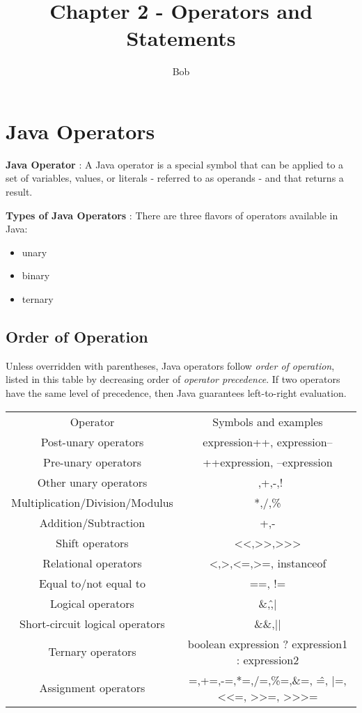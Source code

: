 \documentclass{article}
\author{Bob}
\title{Chapter 2 - Operators and Statements}
\begin{document}
\maketitle

\section{Java Operators}
\textbf{Java Operator} : A Java operator is a special symbol that can be applied to a set of variables, values, or literals - referred to as operands - and that returns a result.

\textbf{Types of Java Operators} : There are three flavors of operators available in Java: 
\begin{itemize}
	\item unary
	\item binary
	\item ternary
\end{itemize}

\subsection{Order of Operation}
Unless overridden with parentheses, Java operators follow \emph{order of operation}, listed in this table by decreasing order of \emph{operator precedence}. If two operators have the same level of precedence, then Java guarantees left-to-right evaluation.

\begin{tabular}{|c|c|}
	\cline{1-2}
	Operator & Symbols and examples \\
	\cline{1-2}
	Post-unary operators & expression++, expression-- \\
	Pre-unary operators & ++expression, --expression \\
	Other unary operators & ~,+,-,! \\
	Multiplication/Division/Modulus & *,/,\% \\
	Addition/Subtraction & +,- \\
	Shift operators & <<,>>,>>> \\
	Relational operators & <,>,<=,>=, instanceof \\
	Equal to/not equal to & ==, != \\
	Logical operators & \&,\^,| \\
	Short-circuit logical operators & \&\&,|| \\
	Ternary operators & boolean expression ? expression1 : expression2 \\
	Assignment operators & =,+=,-=,*=,/=,\%=,\&=, \^=, |=, <<=, >>=, >>>= \\
	\cline{1-2}
\end{tabular}
\end{document}

